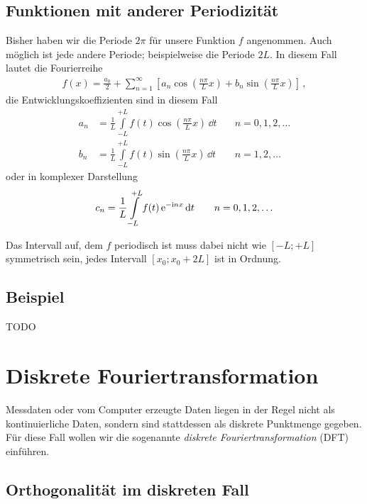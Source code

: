 \documentclass[paper=a4, fontsize=11.0pt, abstractoff, DIV12]{scrartcl}
\begin{document}
\subsection{Funktionen mit anderer Periodizität}

Bisher haben wir die Periode $2\pi$ für unsere Funktion $f$ angenommen. Auch
möglich ist jede andere Periode; beispielweise die Periode $2L$. In diesem Fall
lautet die Fourierreihe
\begin{align}
f(x) = \frac{a_0}{2} + \sum\limits_{n=1}^{\infty}\left[a_n \cos\left(\frac{n\pi}{L}x\right) + b_n \sin\left(\frac{n\pi}{L}x\right)\right]\,,
\end{align}
die Entwicklungskoeffizienten sind in diesem Fall
\begin{align}
a_n &= \frac{1}{L}\int\limits_{-L}^{+L} f(t) \cos\left(\frac{n\pi}{L}x\right)\,\dd t\quad&n=0,1,2,\dots\\
b_n &= \frac{1}{L}\int\limits_{-L}^{+L} f(t) \sin\left(\frac{n\pi}{L}x\right)\,\dd t\quad&n=1,2,\dots
\end{align}
oder in komplexer Darstellung
\begin{align}
c_n = \frac{1}{L}\int\limits_{-L}^{+L} f(t) \,{\mathrm{e}}^{-\mathrm{i} n x}\,\mathrm{d} t\qquad&n=0,1,2,\dots\\
\end{align}

Das Intervall auf, dem $f$ periodisch ist muss dabei nicht wie $[-L;+L]$
symmetrisch sein, jedes Intervall $[x_0; x_0+2L]$ ist in Ordnung.

\subsection{Beispiel}

TODO

\section{Diskrete Fouriertransformation}

Messdaten oder vom Computer erzeugte Daten liegen in der Regel nicht als
kontinuierliche Daten, sondern sind stattdessen als diskrete Punktmenge
gegeben. Für diese Fall wollen wir die sogenannte \emph{diskrete
Fouriertransformation} (DFT) einführen.

\subsection{Orthogonalität im diskreten Fall}
\end{document}
